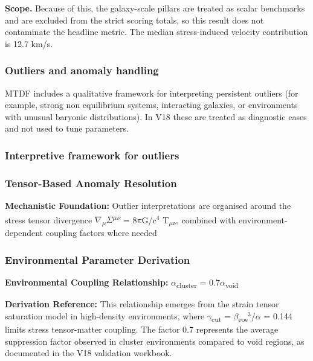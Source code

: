 \documentclass[11pt,a4paper]{article}
\begin{document}
\begin{mdframed}
\begin{mdframed}
\textbf{Scope.} Because of this, the galaxy-scale pillars are treated as scalar benchmarks and are excluded from the strict scoring totals, so this result does not contaminate the headline metric. The median stress-induced velocity contribution is 12.7 km/\allowbreak{}s.
\end{mdframed}

\subsubsection{Outliers and anomaly handling}
MTDF includes a qualitative framework for interpreting persistent outliers (for example, strong non equilibrium systems, interacting galaxies, or environments with unusual baryonic distributions). In V18 these are treated as diagnostic cases and not used to tune parameters.

\subsubsection{Interpretive framework for outliers}
\begin{mdframed}[linecolor=accent,linewidth=0.5pt,backgroundcolor=callout-bg,leftline=true,rightline=true,topline=true,bottomline=true,innerleftmargin=8pt,innerrightmargin=8pt,innertopmargin=6pt,innerbottommargin=6pt]
\subsubsection{Tensor-Based Anomaly Resolution}
\textbf{Mechanistic Foundation:} Outlier interpretations are organised around the stress tensor divergence $\nabla$\textsubscript{$\mu$}$\Sigma$\textsuperscript{$\mu$$\nu$} = 8$\pi$G/\allowbreak{}c$^{4}$ T\textsubscript{$\mu$$\nu$}, combined with environment-dependent coupling factors where needed
\end{mdframed}

\begin{mdframed}[linecolor=accent,linewidth=0.5pt,backgroundcolor=callout-bg,leftline=true,rightline=true,topline=true,bottomline=true,innerleftmargin=8pt,innerrightmargin=8pt,innertopmargin=6pt,innerbottommargin=6pt]
\subsubsection{Environmental Parameter Derivation}
\textbf{Environmental Coupling Relationship:} $\alpha$\textsubscript{cluster} = 0.7$\alpha$\textsubscript{void}

\textbf{Derivation Reference:} This relationship emerges from the strain tensor saturation model in high-density environments, where $\gamma$\textsubscript{cut} = $\beta$\textsubscript{eos}$^{3}$/$\alpha$ = 0.144 limits stress tensor-matter coupling. The factor 0.7 represents the average suppression factor observed in cluster environments compared to void regions, as documented in the V18 validation workbook.


\end{mdframed}
\end{mdframed}
\end{document}
